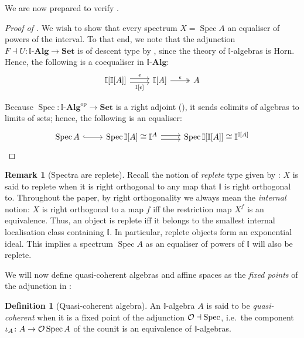 \documentclass[a4paper,12pt]{amsart}
\theoremstyle{definition}
\newtheorem{definition}[theorem]{Definition}
\newtheorem{remark}[theorem]{Remark}
\newcommand{\mb}[1]{\mathbf{#1}}
\newcommand{\mbb}[1]{\mathbb{#1}}
\newcommand{\I}{\mbb I}
\newcommand{\Set}{\mb{Set}}
\newcommand{\alg}{\text{-}\mb{Alg}}
\newcommand{\op}{^{\mathrm{op}}}
\newcommand{\spec}{\operatorname{Spec}}
\begin{document}
We are now prepared to verify .

\begin{proof}[Proof of ]
  We wish to show that every spectrum $X=\spec A$ an equaliser of powers of the interval.
  To that end, we note that the adjunction $F\dashv U\colon \I\alg \to\Set$ is of descent type by , since the theory of $\I$-algebras is Horn. Hence, the following is a coequaliser in $\I\alg$: 
  \[
  \begin{tikzcd}
    \I[\I[A]] \ar[r, shift left, "\epsilon"] \ar[r, shift right, "{\I[\epsilon]}"'] & \I[A] \ar[r, two heads, "\epsilon"] & A
  \end{tikzcd}
  \]

  Because $\spec\colon \I\alg\op\to\Set$ is a right adjoint (), it sends colimits of algebras to limits of sets; hence, the following is an equaliser:
  \[
  \begin{tikzcd}
    \spec A \ar[r, hook] & \spec\I[A] \cong \I^A \ar[r, shift left] \ar[r, shift right] & \spec\I[\I[A]]\cong\I^{\I[A]}
  \end{tikzcd}
  \qedhere
  \]
\end{proof}

\begin{remark}[Spectra are replete]\label{rem:specarereplete}
  Recall the notion of \emph{replete} type given by \citet{hyland1990first}: $X$ is said to replete when it is right orthogonal to any map that $\I$ is right orthogonal to. Throughout the paper, by right orthogonality we always mean the \emph{internal} notion: $X$ is right orthogonal to a map $f$ iff the restriction map $X^f$ is an equivalence. Thus, an object is replete iff it belongs to the smallest internal localisation class containing $\I$. In particular, replete objects form an exponential ideal. This implies a spectrum $\spec A$ as an equaliser of powers of $\I$ will also be replete.
\end{remark}

We will now define quasi-coherent algebras and affine spaces as the \emph{fixed points} of the adjunction in :

\begin{definition}[Quasi-coherent algebra]
  An $\I$-algebra $A$ is said to be \emph{quasi-coherent} when it is a fixed point of the adjunction $\opens \dashv \spec$, i.e.\ the component $\iota_A\colon A \to \opens \spec A$ of the counit is an equivalence of $\I$-algebras.
\end{definition}
\end{document}
